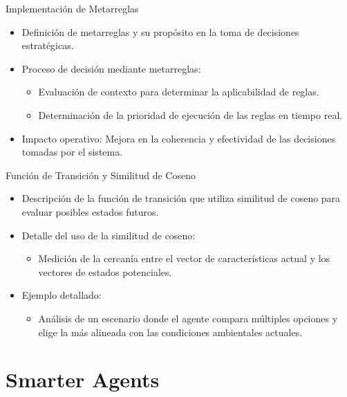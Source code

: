 \documentclass{beamer}
\begin{document}
\begin{frame}{Implementación de Metarreglas}
    \begin{itemize}
        \item Definición de metarreglas y su propósito en la toma de decisiones estratégicas.
        \item Proceso de decisión mediante metarreglas:
              \begin{itemize}
                  \item Evaluación de contexto para determinar la aplicabilidad de reglas.
                  \item Determinación de la prioridad de ejecución de las reglas en tiempo real.
              \end{itemize}
        \item Impacto operativo: Mejora en la coherencia y efectividad de las decisiones tomadas por el sistema.
    \end{itemize}
\end{frame}

\begin{frame}{Función de Transición y Similitud de Coseno}
    \begin{itemize}
        \item Descripción de la función de transición que utiliza similitud de coseno para evaluar posibles estados futuros.
        \item Detalle del uso de la similitud de coseno:
              \begin{itemize}
                  \item Medición de la cercanía entre el vector de características actual y los vectores de estados potenciales.
              \end{itemize}
        \item Ejemplo detallado:
              \begin{itemize}
                  \item Análisis de un escenario donde el agente compara múltiples opciones y elige la más alineada con las condiciones ambientales actuales.
              \end{itemize}
    \end{itemize}
\end{frame}

\section{Smarter Agents}
\end{document}
